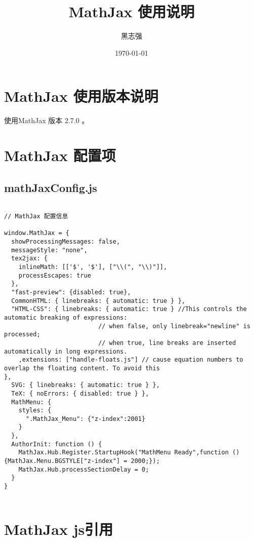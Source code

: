 \documentclass[UTF8]{ctexart}
\title{MathJax 使用说明}
\author{黑志强}
\date{\today}
\begin{document}
 \maketitle
 \tableofcontents

\begin{figure}[ht!]
\end{figure}

\section{MathJax 使用版本说明}
使用MathJax 版本 2.7.0 。

\section{MathJax 配置项}


\subsection{mathJaxConfig.js}
\medskip
\begin{lstlisting}

// MathJax 配置信息

window.MathJax = {
  showProcessingMessages: false,
  messageStyle: "none",
  tex2jax: {
    inlineMath: [['$', '$'], ["\\(", "\\)"]],
    processEscapes: true
  },
  "fast-preview": {disabled: true},
  CommonHTML: { linebreaks: { automatic: true } },
  "HTML-CSS": { linebreaks: { automatic: true } //This controls the automatic breaking of expressions:
                          // when false, only linebreak="newline" is processed;
                          // when true, line breaks are inserted automatically in long expressions.
    ,extensions: ["handle-floats.js"] // cause equation numbers to overlap the floating content. To avoid this
},
  SVG: { linebreaks: { automatic: true } },
  TeX: { noErrors: { disabled: true } },
  MathMenu: {
    styles: {
      ".MathJax_Menu": {"z-index":2001}
    }
  },
  AuthorInit: function () {
    MathJax.Hub.Register.StartupHook("MathMenu Ready",function () {MathJax.Menu.BGSTYLE["z-index"] = 2000;});
    MathJax.Hub.processSectionDelay = 0;
  }
}


\end{lstlisting}

\section{MathJax js引用}
\end{document}
